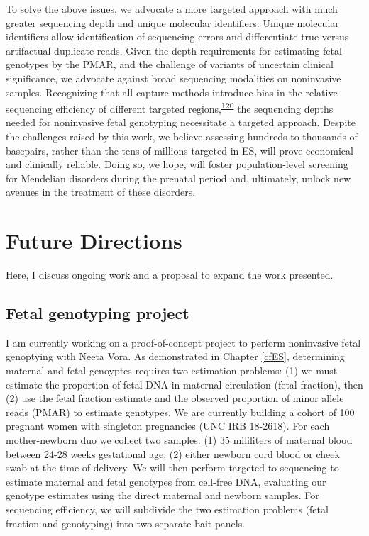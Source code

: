 \documentclass[11pt,letterpaper]{book}
\begin{document}
To solve the above issues, we advocate a more targeted approach with much greater sequencing depth and unique molecular identifiers.
Unique molecular identifiers allow identification of sequencing errors and differentiate true versus artifactual duplicate reads.
Given the depth requirements for estimating fetal genotypes by the PMAR, and the challenge of variants of uncertain clinical significance, we advocate against broad sequencing modalities on noninvasive samples.
Recognizing that all capture methods introduce bias in the relative sequencing efficiency of different targeted regions,\textsuperscript{\protect\hyperlink{ref-seaby:2016aa}{120}} the sequencing depths needed for noninvasive fetal genotyping necessitate a targeted approach.
Despite the challenges raised by this work, we believe assessing hundreds to thousands of basepairs, rather than the tens of millions targeted in ES, will prove economical and clinically reliable.
Doing so, we hope, will foster population-level screening for Mendelian disorders during the prenatal period and, ultimately, unlock new avenues in the treatment of these disorders.

\hypertarget{future-directions}{%
\chapter{Future Directions}\label{future-directions}}

Here, I discuss ongoing work and a proposal to expand the work presented.

\hypertarget{fetal-genotyping-project}{%
\section{Fetal genotyping project}\label{fetal-genotyping-project}}

I am currently working on a proof-of-concept project to perform noninvasive fetal genoptying with Neeta Vora.
As demonstrated in Chapter \ref{cfES}, determining maternal and fetal genoyptes requires two estimation problems: (1) we must estimate the proportion of fetal DNA in maternal circulation (fetal fraction), then (2) use the fetal fraction estimate and the observed proportion of minor allele reads (PMAR) to estimate genotypes.
We are currently building a cohort of 100 pregnant women with singleton pregnancies (UNC IRB 18-2618).
For each mother-newborn duo we collect two samples: (1) 35 mililiters of maternal blood between 24-28 weeks gestational age; (2) either newborn cord blood or cheek swab at the time of delivery.
We will then perform targeted to sequencing to estimate maternal and fetal genotypes from cell-free DNA, evaluating our genotype estimates using the direct maternal and newborn samples.
For sequencing efficiency, we will subdivide the two estimation problems (fetal fraction and genotyping) into two separate bait panels.
\end{document}
